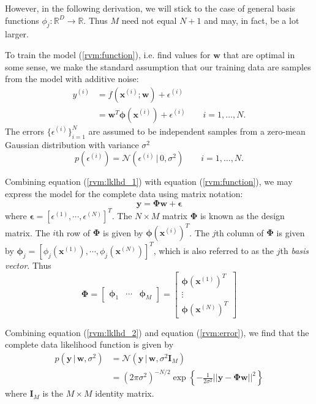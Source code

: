 However, in the following derivation, we will stick to the case of general basis functions $\phi_j:\mathbb{R}^D\to\mathbb{R}$.
Thus $M$ need not equal $N+1$ and may, in fact, be a lot larger.

To train the model (\ref{rvm:function}), i.e. find values for $\bm w$ that are optimal in some sense, we make the standard assumption that our training data are samples from the model with additive noise:
\begin{equation}
  \label{rvm:lklhd_1}
  \begin{split}
    y^{(i)} &= f(\bm x^{(i)}; \bm w) + \epsilon^{(i)}\\
    &= \bm w^T \bm \phi(\bm x^{(i)}) + \epsilon^{(i)}\qquad i = 1, \dots, N.
  \end{split}
\end{equation}
The errors $\{\epsilon^{(i)}\}_{i=1}^N$ are assumed to be independent samples from a zero-mean Gaussian distribution with variance $\sigma^2$
\begin{equation}
  \label{rvm:error}
  p(\epsilon^{(i)}) = \mathcal{N}(\epsilon^{(i)}\,|\,0, \sigma^2)\qquad i = 1, \dots, N.
\end{equation}

Combining equation (\ref{rvm:lklhd_1}) with equation (\ref{rvm:function}), we may express the model for the complete data using matrix notation:
\begin{equation}
  \label{rvm:lklhd_2}
  \bm y = \bm\Phi \bm w + \bm \epsilon
\end{equation}
where $\bm \epsilon = \left[\epsilon^{(1)}, \cdots, \epsilon^{(N)}\right]^T$.
The $N\times M$ matrix $\bm \Phi$ is known as the design matrix. 
The $i$th row of $\bm \Phi$ is given by $\bm \phi(\bm x^{(i)})^T$.
The $j$th column of $\bm \Phi$ is given by $\bm \phi_j = \left[\phi_j\left(\bm x^{(1)}\right), \cdots, \phi_j\left(\bm x^{(N)}\right)\right]^T$, which is also referred to as the $j$th \emph{basis vector}.
Thus
\begin{equation*}
  \bm\Phi =
  \begin{bmatrix}
    \bm\phi_1 & \cdots & \bm\phi_M
  \end{bmatrix}
  =
  \begin{bmatrix}
    \bm\phi(\bm x^{(1)})^T\\
    \vdots\\
    \bm\phi(\bm x^{(N)})^T
  \end{bmatrix}
\end{equation*}

Combining equation (\ref{rvm:lklhd_2}) and equation (\ref{rvm:error}), we find that the complete data likelihood function is given by
\begin{equation}
  \label{rvm:complete_lk}
  \begin{split}
    p\left(\bm y\,|\,\bm w,\sigma^2\right) &= \mathcal{N}\left(\bm y\,|\,\bm w,\sigma^2 \bm I_M\right)\\
    &= (2\pi\sigma^2)^{-N/2} \exp\left\{-\frac{1}{2\sigma^2}||\bm y - \bm\Phi\bm w||^2\right\}
  \end{split}
\end{equation}
where $\bm I_M$ is the $M\times M$ identity matrix.


